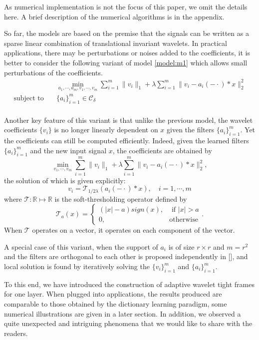 \documentclass[a4paper]{article}
\begin{document}
As numerical implementation  is not the focus of this paper, we omit the details here. A brief description of the numerical algorithms is in the appendix.

So far, the models are based on the premise that the signals can be written as a sparse linear combination of translational invariant wavelets. In practical applications, there may be perturbations or noises added to the coefficients, it is better to consider the following variant of model \eqref{model:m1} which allows small perturbations of the coefficients.
\begin{equation}
\label{model:m3}
	\begin{aligned}
		&\min_{a_1,\cdots,a_m,v_1,\cdots,v_m} \sum_{i=1}^m \|v_i\|_1  + \lambda \sum_{i=1}^m \|v_i - a_i(-\cdot)*x\|_2^2\\
		\textrm{subject to} \quad& \{a_i\}_{i=1}^m \in \mathcal{C_\delta} \\		 
	\end{aligned}
\end{equation}

Another key feature of this variant  is that unlike the previous model, the wavelet coefficients $\{v_i\}$ is no longer linearly dependent on $x$ given the filters $\{a_i\}_{i=1}^m$. Yet the coefficients can still be computed efficiently. Indeed, given the learned filters $\{a_i\}_{i=1}^m$ and the new input signal $x$, the coefficients are obtained by 
\[
	\min_{v_1,\cdots,v_m} \sum_{i=1}^m \|v_i\|_1 + \lambda \sum_{i=1}^m \|v_i - a_i(-\cdot)*x\|_2^2,
\]
the solution of which is given explicitly:
\[
	v_i = \mathcal{T}_{1/2\lambda}( a_i(-\cdot)*x),\quad i=1,\cdots,m
\]
where $\mathcal{T}: \mathbb{R}\mapsto \mathbb{R}$ is the soft-thresholding operator defined by
\[
	\mathcal{T}_a(x)=\left\{ \begin{array}{lr}  (|x|-a)sign(x), &\textrm{ if } |x| > a \\0, &\textrm{otherwise}\end{array}\right . .
\]
When $\mathcal{T}$ operates on a vector, it operates on each component of the vector.


A special case of this variant, when the support of $a_i$ is of size $r\times r$ and $m=r^2$ and the filters are orthogonal to each other is proposed independently in [], and local solution is found by iteratively solving the $\{v_i\}_{i=1}^m$ and $\{a_i\}_{i=1}^m$.

To this end, we have introduced the construction of adaptive wavelet tight frames for one layer. When plugged into applications, the results produced are comparable to those obtained by the dictionary learning paradigm, some numerical illustrations are given in a later section. In addition, we observed a quite unexpected and intriguing phenomena that we would like to share with the readers.
\end{document}
